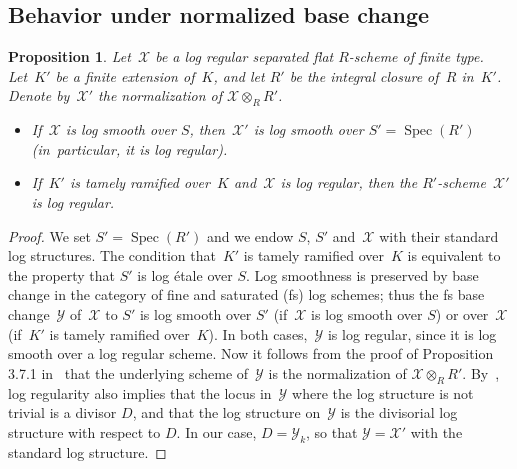 \documentclass[11pt]{article}
\newcommand{\Subsection}{\subsection}
\newtheorem{prop}[equation]{Proposition}
\theoremstyle{definition}
\numberwithin{equation}{subsection}
\newcommand{\cX}{\ensuremath{\mathscr{X}}}
\newcommand{\cY}{\ensuremath{\mathscr{Y}}}
\DeclareMathOperator{\Spec}{Spec}
\begin{document}
\Subsection{Behavior under normalized base change}
\begin{prop}\label{prop:logreg}
Let~$\cX$ be a log regular separated flat $R$\nobreakdash-scheme of finite type.
Let~$K'$ be a finite extension of~$K$, and let $R'$ be the integral closure of~$R$ in~$K'$. Denote by~$\cX'$ the normalization of $\cX\otimes_R R'$.
\begin{itemize}
\item[(i)]
If~$\cX$ is log smooth over $S$, then~$\cX'$ is log smooth over $S'=\Spec(R')$ (in~particular, it is log regular).
\item[(ii)]
If~$K'$ is tamely ramified over~$K$ and~$\cX$ is log regular, then the $R'$-scheme~$\cX'$ is log regular.
\end{itemize}
\end{prop}
\begin{proof}
We set $S'=\Spec(R')$ and we endow $S$, $S'$ and~$\cX$ with their standard log structures. The condition that~$K'$ is tamely ramified over~$K$ is equivalent to the property that $S'$ is log étale over $S$.
Log smoothness is preserved by base change in the category of fine and saturated (fs) log schemes; thus the fs base change~$\cY$ of~$\cX$ to $S'$ is log smooth over $S'$ (if~$\cX$ is log smooth over $S$) or over~$\cX$ (if~$K'$ is tamely ramified over~$K$). In both cases,~$\cY$ is log regular, since it is log smooth over a log regular scheme.
Now it follows from the proof of Proposition 3.7.1 in~\cite{logzeta} that the underlying scheme of~$\cY$ is the normalization of $\cX\otimes_R R'$.
By~\cite[11.6]{kato}, log regularity also implies that the locus in~$\cY$ where the log structure is not trivial is a divisor $D$, and that the log structure on~$\cY$ is the divisorial log structure with respect to $D$. In our case, $D=\cY_k$, so that $\cY=\cX'$ with the standard log structure.
\end{proof}
\end{document}
